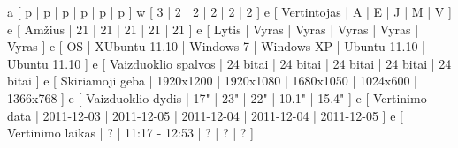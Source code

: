 \xtableu
{
  a [ p | p | p | p | p | p ]
  w [ 3 | 2 | 2 | 2 | 2 | 2 ]
  e [ Vertintojas         | A | E | J | M | V ]
  e [ Amžius              | 21 | 21 | 21 | 21 | 21 ]
  e [ Lytis               | Vyras | Vyras | Vyras | Vyras | Vyras ]
  e [ OS                  | XUbuntu 11.10 | Windows 7 | Windows XP | Ubuntu 11.10 | Ubuntu 11.10 ]
  e [ Vaizduoklio spalvos | 24 bitai | 24 bitai | 24 bitai | 24 bitai | 24 bitai ]
  e [ Skiriamoji geba     | 1920x1200 | 1920x1080 | 1680x1050 | 1024x600 | 1366x768 ]
  e [ Vaizduoklio dydis   | 17" | 23" | 22" | 10.1" | 15.4" ]
  e [ Vertinimo data      | 2011-12-03 | 2011-12-05 | 2011-12-04 | 2011-12-04  | 2011-12-05 ]
  e [ Vertinimo laikas    | ? | 11:17 - 12:53 | ? | ? | ? ]
}

